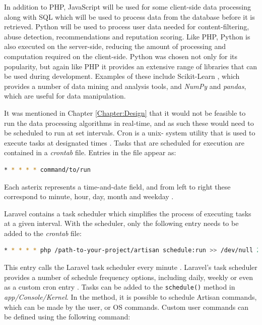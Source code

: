In addition to PHP, JavaScript will be used for some client-side data processing along with SQL which will be used to process data from the database before it is retrieved. Python will be used to process user data needed for content-filtering, abuse detection, recommendations and reputation scoring. Like PHP, Python is also executed on the server-side, reducing the amount of processing and computation required on the client-side. Python was chosen not only for its popularity, but again like PHP it provides an extensive range of libraries that can be used during development. Examples of these include Scikit-Learn \cite{scikit:home}, which provides a number of data mining and analysis tools, and \emph{NumPy} and \emph{pandas}, which are useful for data manipulation.

It was mentioned in Chapter \ref{Chapter:Design} that it would not be feasible to run the data processing algorithms in real-time, and as such these would need to be scheduled to run at set intervals. Cron is a unix- system utility that is used to execute tasks at designated times \cite{Ubuntu:Cron}. Tasks that are scheduled for execution are contained in a \textit{crontab} file. Entries in the file appear as:
\begin{lstlisting}[language=bash]
* * * * * command/to/run
\end{lstlisting}

Each asterix represents a time-and-date field, and from left to right these correspond to minute, hour, day, month and weekday \cite{Ubuntu:Cron}. 

Laravel contains a task scheduler which simplifies the process of executing tasks at a given interval. With the scheduler, only the following entry needs to be added to the \textit{crontab} file:

\begin{lstlisting}[language=bash]
* * * * * php /path-to-your-project/artisan schedule:run >> /dev/null 2>&1
\end{lstlisting}

This entry calls the Laravel task scheduler every minute \cite{Laravel:Scheduling}. Laravel's task scheduler provides a number of schedule frequency options, including daily, weekly or even as a custom cron entry \cite{Laravel:Scheduling}. Tasks can be added to the \texttt{schedule()} method in \textit{app/Console/Kernel}. In the method, it is possible to schedule Artisan commands, which can be made by the user, or OS commands. Custom user commands can be defined using the following command:

